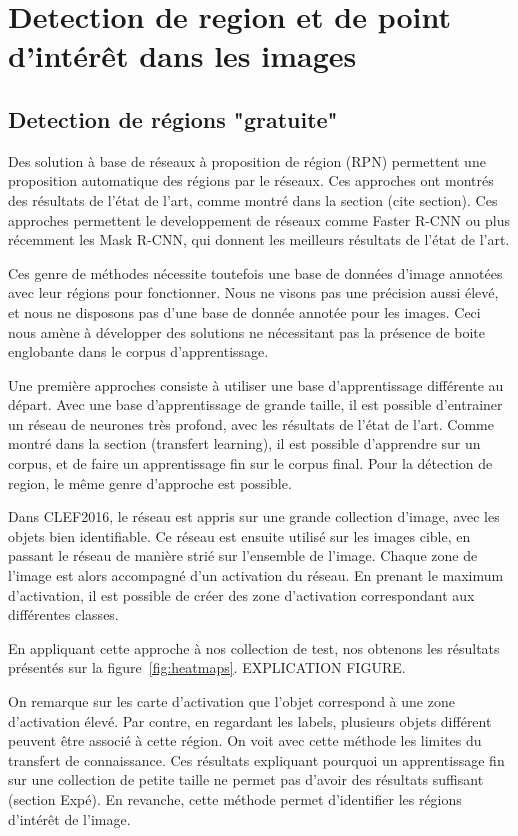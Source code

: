 \chapter{Detection de region et de point d'intérêt dans les images}


\section{Detection de régions "gratuite" }

Des solution à base de réseaux à proposition de région (RPN) permettent une proposition automatique des régions par le réseaux. Ces approches ont montrés des résultats de l'état de l'art, comme montré dans la section (cite section). Ces approches permettent le developpement de réseaux comme Faster R-CNN ou plus récemment les Mask R-CNN, qui donnent les meilleurs résultats de l'état de l'art.

Ces genre de méthodes nécessite toutefois une base de données d'image annotées avec leur régions pour fonctionner. Nous ne visons pas une précision aussi élevé, et nous ne disposons pas d'une base de donnée annotée pour les images. Ceci nous amène à développer des solutions ne nécessitant pas la présence de boite englobante dans le corpus d'apprentissage.

Une première approches consiste à utiliser une base d'apprentissage différente au départ. Avec une base d'apprentissage de grande taille, il est possible d'entrainer un réseau de neurones très profond, avec les résultats de l'état de l'art. Comme montré dans la section (transfert learning), il est possible d'apprendre sur un corpus, et de faire un apprentissage fin sur le corpus final. Pour la détection de region, le même genre d'approche est possible. 

Dans CLEF2016, le réseau est appris sur une grande collection d'image, avec les objets bien identifiable. Ce réseau est ensuite utilisé sur les images cible, en passant le réseau de manière strié sur l'ensemble de l'image. Chaque zone de l'image est alors accompagné d'un activation du réseau. En prenant le maximum d'activation, il est possible de créer des zone d'activation correspondant aux différentes classes.

En appliquant cette approche à nos collection de test, nos obtenons les résultats présentés sur la figure~\ref{fig:heatmaps}. EXPLICATION FIGURE.

On remarque sur les carte d'activation que l'objet correspond à une zone d'activation élevé. Par contre, en regardant les labels, plusieurs objets différent peuvent être associé à cette région. On voit avec cette méthode les limites du transfert de connaissance. Ces résultats expliquant pourquoi un apprentissage fin sur une collection de petite taille ne permet pas d'avoir des résultats suffisant (section Expé). En revanche, cette méthode permet d'identifier les régions d'intérêt de l'image.




